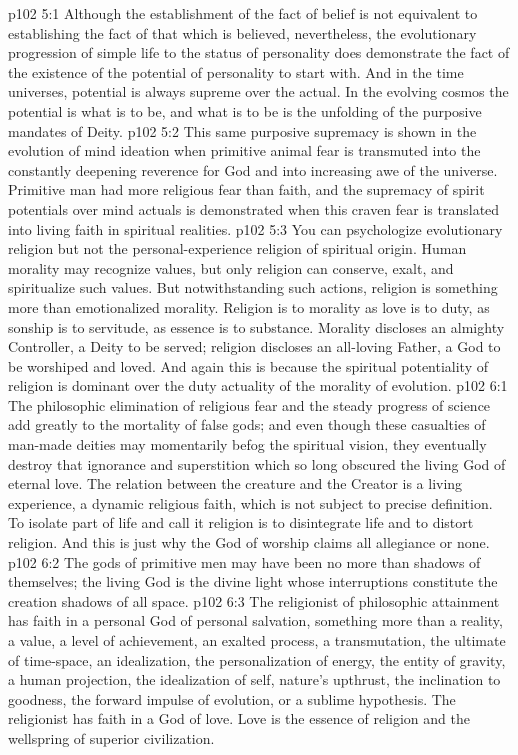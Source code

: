 \vs p102 5:1 Although the establishment of the fact of belief is not equivalent to establishing the fact of that which is believed, nevertheless, the evolutionary progression of simple life to the status of personality does demonstrate the fact of the existence of the potential of personality to start with. And in the time universes, potential is always supreme over the actual. In the evolving cosmos the potential is what is to be, and what is to be is the unfolding of the purposive mandates of Deity.
\vs p102 5:2 This same purposive supremacy is shown in the evolution of mind ideation when primitive animal fear is transmuted into the constantly deepening reverence for God and into increasing awe of the universe. Primitive man had more religious fear than faith, and the supremacy of spirit potentials over mind actuals is demonstrated when this craven fear is translated into living faith in spiritual realities.
\vs p102 5:3 You can psychologize evolutionary religion but not the personal\hyp{}experience religion of spiritual origin. Human morality may recognize values, but only religion can conserve, exalt, and spiritualize such values. But notwithstanding such actions, religion is something more than emotionalized morality. Religion is to morality as love is to duty, as sonship is to servitude, as essence is to substance. Morality discloses an almighty Controller, a Deity to be served; religion discloses an all\hyp{}loving Father, a God to be worshiped and loved. And again this is because the spiritual potentiality of religion is dominant over the duty actuality of the morality of evolution.
\vs p102 6:1 The philosophic elimination of religious fear and the steady progress of science add greatly to the mortality of false gods; and even though these casualties of man\hyp{}made deities may momentarily befog the spiritual vision, they eventually destroy that ignorance and superstition which so long obscured the living God of eternal love. The relation between the creature and the Creator is a living experience, a dynamic religious faith, which is not subject to precise definition. To isolate part of life and call it religion is to disintegrate life and to distort religion. And this is just why the God of worship claims all allegiance or none.
\vs p102 6:2 The gods of primitive men may have been no more than shadows of themselves; the living God is the divine light whose interruptions constitute the creation shadows of all space.
\vs p102 6:3 \pc The religionist of philosophic attainment has faith in a personal God of personal salvation, something more than a reality, a value, a level of achievement, an exalted process, a transmutation, the ultimate of time\hyp{}space, an idealization, the personalization of energy, the entity of gravity, a human projection, the idealization of self, nature’s upthrust, the inclination to goodness, the forward impulse of evolution, or a sublime hypothesis. The religionist has faith in a God of love. Love is the essence of religion and the wellspring of superior civilization.
